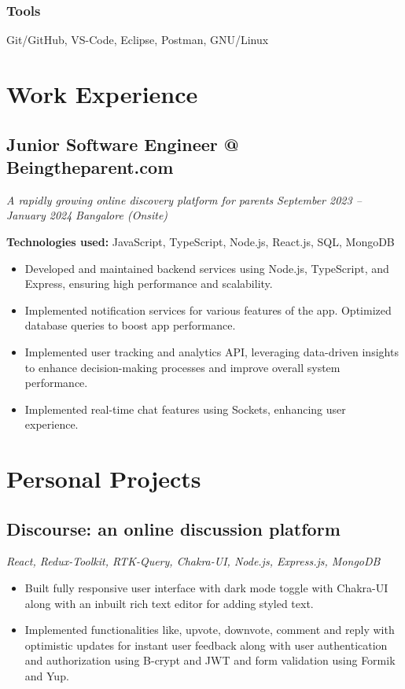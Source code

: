 \documentclass[a4paper]{article}
\begin{document}
\subsubsection*{Tools}
Git/GitHub, VS-Code, Eclipse, Postman, GNU/Linux

\section{Work Experience}
\subsection{Junior Software Engineer @ Beingtheparent.com}
\textit{A rapidly growing online discovery platform for parents}
\hfill
\textit{September 2023 -- January 2024}
\textbar
\textit{ Bangalore (Onsite)}

\vspace{3pt}
\textbf{Technologies used:}
JavaScript, TypeScript, Node.js, React.js, SQL, MongoDB
\begin{itemize}
	\item Developed and maintained backend services using Node.js, TypeScript, and Express, ensuring high performance and scalability.
	\item Implemented notification services for various features of the app. Optimized database queries to boost app performance.
	\item Implemented user tracking and analytics API, leveraging data-driven insights to enhance decision-making processes and improve overall system performance.
	\item Implemented real-time chat features using Sockets, enhancing user experience.
\end{itemize}
\section{Personal Projects}
\subsection{Discourse: an online discussion platform}
\textit{React, Redux-Toolkit, RTK-Query, Chakra-UI, Node.js, Express.js, MongoDB}
\hfill
\href{https://discourse-app.netlify.app/}{ \faLink }
\textbar
\href{https://github.com/jatinkumar-me/Discourse}{ \faCode}
\begin{itemize}
	\item Built fully responsive user interface with dark mode toggle with Chakra-UI along with an inbuilt rich text editor for adding styled text.
	\item Implemented functionalities like, upvote, downvote, comment and reply with optimistic updates for instant user feedback along with user authentication and authorization using B-crypt and JWT and form validation using Formik and Yup.
\end{itemize}
\end{document}
